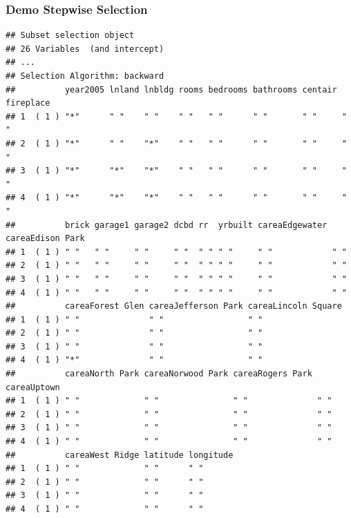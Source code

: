 \documentclass[
  shownotes,
  xcolor={svgnames},
  hyperref={colorlinks,citecolor=DarkBlue,linkcolor=DarkRed,urlcolor=DarkBlue}
  , aspectratio=169]{beamer}
\newenvironment{Shaded}{\begin{snugshade}}{\end{snugshade}}
\newcommand{\KeywordTok}[1]{\textcolor[rgb]{0.13,0.29,0.53}{\textbf{#1}}}
\newcommand{\NormalTok}[1]{#1}
\newcommand{\OperatorTok}[1]{\textcolor[rgb]{0.81,0.36,0.00}{\textbf{#1}}}
\begin{document}
\begin{frame}[fragile]
\frametitle{Demo Stepwise Selection}

\begin{scriptsize}
\begin{Shaded}
\end{Shaded}
\end{scriptsize}
\begin{tiny}
\begin{verbatim}
## Subset selection object
## 26 Variables  (and intercept)
## ...
## Selection Algorithm: backward
##          year2005 lnland lnbldg rooms bedrooms bathrooms centair fireplace
## 1  ( 1 ) "*"      " "    " "    " "   " "      " "       " "     " "      
## 2  ( 1 ) "*"      " "    "*"    " "   " "      " "       " "     " "      
## 3  ( 1 ) "*"      "*"    "*"    " "   " "      " "       " "     " "      
## 4  ( 1 ) "*"      "*"    "*"    " "   " "      " "       " "     " "      
##          brick garage1 garage2 dcbd rr  yrbuilt careaEdgewater careaEdison Park
## 1  ( 1 ) " "   " "     " "     " "  " " " "     " "            " "             
## 2  ( 1 ) " "   " "     " "     " "  " " " "     " "            " "             
## 3  ( 1 ) " "   " "     " "     " "  " " " "     " "            " "             
## 4  ( 1 ) " "   " "     " "     " "  " " " "     " "            " "             
##          careaForest Glen careaJefferson Park careaLincoln Square
## 1  ( 1 ) " "              " "                 " "                
## 2  ( 1 ) " "              " "                 " "                
## 3  ( 1 ) " "              " "                 " "                
## 4  ( 1 ) "*"              " "                 " "                
##          careaNorth Park careaNorwood Park careaRogers Park careaUptown
## 1  ( 1 ) " "             " "               " "              " "        
## 2  ( 1 ) " "             " "               " "              " "        
## 3  ( 1 ) " "             " "               " "              " "        
## 4  ( 1 ) " "             " "               " "              " "        
##          careaWest Ridge latitude longitude
## 1  ( 1 ) " "             " "      " "      
## 2  ( 1 ) " "             " "      " "      
## 3  ( 1 ) " "             " "      " "      
## 4  ( 1 ) " "             " "      " "
\end{verbatim}
\end{tiny}

\end{frame}




\end{document}
